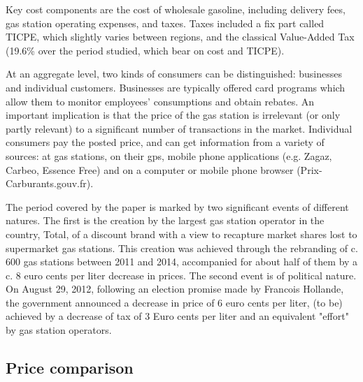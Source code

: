 \documentclass[english]{article}
\begin{document}
Key cost components are the cost of wholesale gasoline, including delivery fees,  gas station operating expenses, and taxes. Taxes included a fix part called TICPE, which slightly varies between regions, and the classical Value-Added Tax (19.6\% over the period studied, which bear on cost and TICPE).

At an aggregate level, two kinds of consumers can be distinguished: businesses and individual customers. Businesses are typically offered card programs which allow them to monitor employees' consumptions and obtain rebates. An important implication is that the price of the gas station is irrelevant (or only partly relevant) to a significant number of transactions in the market. Individual consumers pay the posted price, and can get information from a variety of sources: at gas stations, on their gps, mobile phone applications (e.g. Zagaz, Carbeo, Essence Free) and on a computer or mobile phone browser (Prix-Carburants.gouv.fr).

The period covered by the paper is marked by two significant events of different natures. The first is the creation by the largest gas station operator in the country, Total, of a discount brand with a view to recapture market shares lost to supermarket gas stations. This creation was achieved through the rebranding of c. 600 gas stations between 2011 and 2014, accompanied for about half of them by a c. 8 euro cents per liter decrease in prices. The second event is of political nature. On August 29, 2012, following an election promise made by Francois Hollande, the government announced a decrease in price of 6 euro cents per liter, (to be) achieved by a decrease of tax of 3 Euro cents per liter and an equivalent "effort" by gas station operators.

\subsection{Price comparison}
\end{document}
